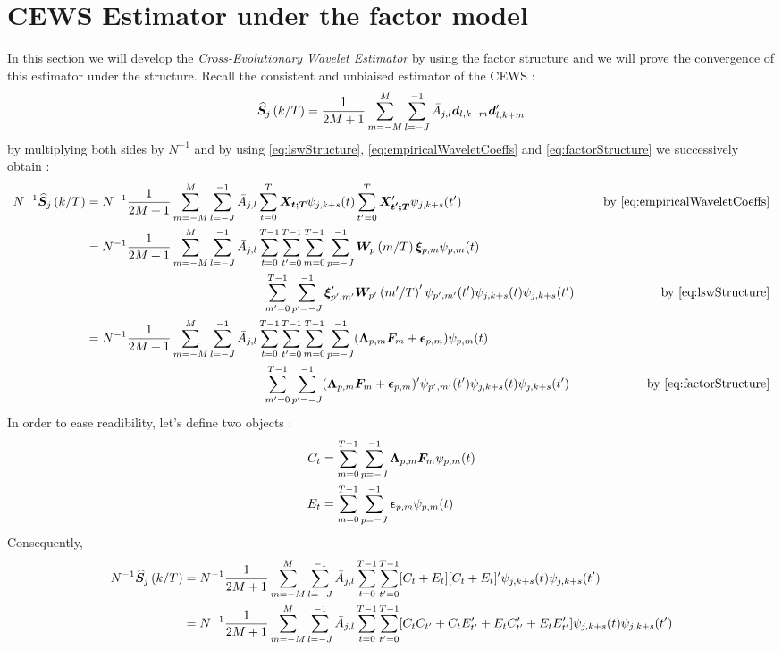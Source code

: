 \documentclass[main_document.tex]{subfiles}
\begin{document}
	\section{CEWS Estimator under the factor model}
	In this section we will develop the \emph{Cross-Evolutionary Wavelet Estimator} by using the factor structure and we will prove the convergence of this estimator under the structure.
	Recall the consistent and unbiaised estimator of the CEWS : 
	\begin{align*}
		\estimCEWS{j}{k} = \frac{\displaystyle 1}{\displaystyle 2M+1} \sum_{m=-M}^{M}\sum_{l=-J}^{-1} \bar{A}_{j,l}\coeffs{l}{k+m}\coeffs{l}{k+m}'
	\end{align*}
	by multiplying both sides by $N^{-1}$ and by using \eqref{eq:lswStructure}, \eqref{eq:empiricalWaveletCoeffs} and \eqref{eq:factorStructure} we successively obtain : 
	\begin{align*}
		N^{-1} \estimCEWS{j}{k} &= N^{-1}  \frac{\displaystyle 1}{\displaystyle 2M+1} \sum_{m=-M}^{M} \scalesum{l} \invA{j}{l} \sum_{t=0}^{T} \X{t}\wavelet{j}{k+s}{t} \sum_{t'=0}^{T} \X{t'}'\wavelet{j}{k+s}{t'} &\quad \text{ by } \eqref{eq:empiricalWaveletCoeffs} \\
						&= N^{-1}  \frac{\displaystyle 1}{\displaystyle 2M+1} \sum_{m=-M}^{M} \scalesum{l} \invA{j}{l} \locsum{t} \locsum{t'} \locsum{m} \scalesum{p} \W{p}{m} \increment{p}{m} \wavelet{p}{m}{t} \\
	 & \hspace{5cm} \locsum{m'} \scalesum{p'} \increment{p'}{m'}' \W{p'}{m'}' \wavelet{p'}{m'}{t'} \wavelet{j}{k+s}{t} \wavelet{j}{k+s}{t'} &\quad \text{ by } \eqref{eq:lswStructure} \\
						&= N^{-1}  \frac{\displaystyle 1}{\displaystyle 2M+1} \sum_{m=-M}^{M} \scalesum{l} \invA{j}{l} \locsum{t} \locsum{t'} \locsum{m} \scalesum{p} (\loadings{p}{m}\factors{m} + \idioError{p}{m}) \wavelet{p}{m}{t} \\
	 & \hspace{5cm} \locsum{m'} \scalesum{p'} (\loadings{p}{m}\factors{m} + \idioError{p}{m})' \wavelet{p'}{m'}{t'} \wavelet{j}{k+s}{t} \wavelet{j}{k+s}{t'} &\quad \text{ by } \eqref{eq:factorStructure}
	\end{align*}
In order to ease readibility, let's define two objects : 
	\begin{align}
		C_t &= \locsum{m}\scalesum{p} \loadings{p}{m}\factors{m}\wavelet{p}{m}{t} \label{eq:C}\\
		E_t &= \locsum{m} \scalesum{p} \idioError{p}{m}\wavelet{p}{m}{t} \label{eq:E}
	\end{align}
Consequently, 
	\begin{align*}
		N^{-1} \estimCEWS{j}{k} &= N^{-1}  \frac{\displaystyle 1}{\displaystyle 2M+1} \sum_{m=-M}^{M} \scalesum{l} \invA{j}{l} \locsum{t} \locsum{t'} [C_t + E_t][C_t + E_t]' \wavelet{j}{k+s}{t} \wavelet{j}{k+s}{t'} \\
							   &= N^{-1}  \frac{\displaystyle 1}{\displaystyle 2M+1} \sum_{m=-M}^{M} \scalesum{l} \invA{j}{l} \locsum{t} \locsum{t'} [C_t C_{t'} + C_t E_{t'}' + E_t C_{t'}' + E_t E_{t'}'] \wavelet{j}{k+s}{t} \wavelet{j}{k+s}{t'}
	\end{align*}
\end{document}
